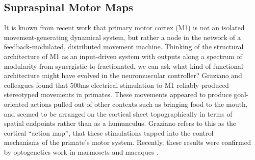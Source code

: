 \documentclass[../main.tex]{subfiles}
\begin{document}







\subsection{Supraspinal Motor Maps}\label{supraspinal-motor-maps}

It is known from recent work that primary motor cortex (M1) is not an isolated movement-generating dynamical system, but rather a node in the network of a feedback-modulated, distributed movement machine\cite{sauerbreiCorticalPatternGeneration2019}. Thinking of the structural architecture of M1 as an input-driven system with outputs along a spectrum of modularity from synergistic to fractionated, we can ask what kind of functional architecture might have evolved in the neuromuscular controller? Graziano and colleagues found that 500ms electrical stimulation to M1 reliably produced stereotyped movements in primates\cite{grazianoOrganizationBehaviorialRepertoire2006}. These movements appeared to produce goal-oriented actions pulled out of other contexts such as bringing food to the mouth, and seemed to be arranged on the cortical sheet topographically in terms of spatial endpoints rather than as a humunculus. Graziano refers to this as the cortical ``action map'', that these stimulations tapped into the control mechanisms of the primate's motor system\cite{grazianoIntelligentMovementMachine2009}. Recently, these results were confirmed by optogenetics work in marmosets and macaques \cite{ebinaArmMovementsInduced2019,watanabeForelimbMovementsEvoked2020}.
\end{document}
